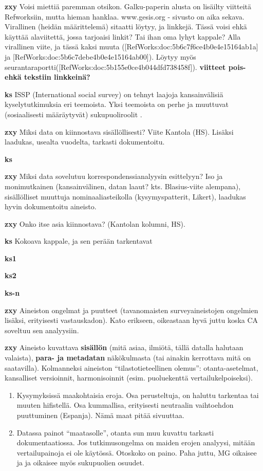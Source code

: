 \documentclass[finnish,]{book}
\theoremstyle{definition}
\theoremstyle{definition}
\theoremstyle{definition}
\theoremstyle{remark}
\begin{document}
\textbf{zxy} Voisi miettiä paremman otsikon. Galku-paperin alusta on
lisäilty viitteitä Refworksiin, mutta hieman hanklaa. www.gesis.org -
sivusto on aika sekava. Virallinen (heidän määrittelemä) sitaatti
löytyy, ja linkkejä. Tässä voisi ehkä käyttää alaviitettä, jossa
tarjoaisi linkit? Tai ihan oma lyhyt kappale? Alla virallinen viite, ja
tässä kaksi muuta ({[}RefWorks:doc:5b6c7f6ce4b0e4e15164ab1a{]} ja
{[}RefWorks:doc:5b6c7debe4b0e4e15164ab00{]}). Löytyy myös
seurantaraportti({[}RefWorks:doc:5b155e0ce4b044dfd738458f{]}).
\textbf{viitteet pois- ehkä tekstiin linkkeinä?}

\textbf{ks} ISSP (International social survey) on tehnyt laajoja
kansainvälisiä kyselytutkimuksia eri teemoista. Yksi teemoista on perhe
ja muuttuvat (sosiaalisesti määräytyvät) sukupuoliroolit
\citep{RefWorks:doc:5b6c7b0de4b0fd36f5bb4c2a}.

\textbf{zxy} Miksi data on kiinnostava sisällöllisesti? Viite Kantola
(HS). Lisäksi laadukas, usealta vuodelta, tarkasti dokumentoitu.

\textbf{ks}

\textbf{zxy} Miksi data sovelutuu korrespondenssianalyysin esittelyyn?
Iso ja monimutkainen (kansainvälinen, datan laaut? kts. Blasius-viite
alempana), sisällölliset muuttuja nominaaliasteikolla (kysymyspatterit,
Likert), laadukas hyvin dokumentoitu aineisto.

\textbf{zxy} Onko itse asia kiinnostava? (Kantolan kolumni, HS).

\textbf{ks} Kokoava kappale, ja sen perään tarkentavat

\textbf{ks1}

\textbf{ks2}

\textbf{ks-n}

\textbf{zxy} Aineiston ongelmat ja puutteet (tavanomaisten
surveyaineistojen ongelmien lisäksi, erityisesti vastauskadon). Kato
erikseen, oikeastaan hyvä juttu koska CA soveltuu sen analyysiin.

\textbf{zxy} Aineisto kuvattava \textbf{sisällön} (mitä asiaa, ilmiötä,
tällä datalla halutaan valaista), \textbf{para- ja metadatan}
näkökulmasta (tai ainakin kerrottava mitä on saatavilla). Kolmanneksi
aineiston ``tilastotieteellinen olemus'': otanta-asetelmat, kansalliset
versioinnit, harmonisoinnit (esim. puoluekenttä vertailukelpoiseksi).

\begin{enumerate}
\def\labelenumi{\arabic{enumi}.}
\item
  Kysymyksissä maakohtaisia eroja. Osa perusteltuja, on haluttu
  tarkentaa tai muuten hifistellä. Osa kummallisa, erityisesti
  neutraalin vaihtoehdon puuttuminen (Espanja). Nämä maat pitää
  sivuuttaa.
\item
  Datassa painot ``maatasolle'', otanta sun muu kuvattu tarkasti
  dokumentaatiossa. Jos tutkimusongelma on maiden erojen analyysi,
  mitään vertailupainoja ei ole käytössä. Otoskoko on paino. Paha juttu,
  MG oikaisee ja ja oikaisee myös sukupuolien osuudet.
\end{enumerate}
\end{document}
